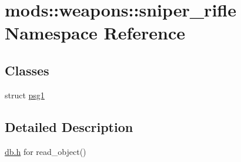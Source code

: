 \hypertarget{namespacemods_1_1weapons_1_1sniper__rifle}{}\section{mods\+:\+:weapons\+:\+:sniper\+\_\+rifle Namespace Reference}
\label{namespacemods_1_1weapons_1_1sniper__rifle}
\subsection*{Classes}
\begin{DoxyCompactItemize}
\item 
struct \hyperlink{structmods_1_1weapons_1_1sniper__rifle_1_1psg1}{psg1}
\end{DoxyCompactItemize}


\subsection{Detailed Description}
\hyperlink{db_8h_source}{db.\+h} for read\+\_\+object() 